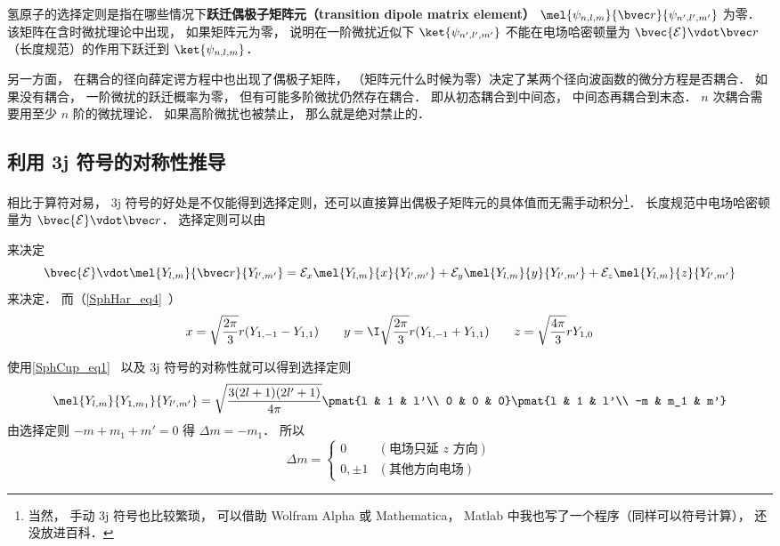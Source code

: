 
\begin{issues}
\issueDraft
\end{issues}


氢原子的选择定则是指在哪些情况下\textbf{跃迁偶极子矩阵元（transition dipole matrix element）} $\mel{\psi_{n,l,m}}{\bvec r}{\psi_{n',l',m'}}$ 为零． 该矩阵在含时微扰理论中出现， 如果矩阵元为零， 说明在一阶微扰近似下 $\ket{\psi_{n',l',m'}}$ 不能在电场哈密顿量为 $\bvec{\mathcal{E}}\vdot \bvec r$（长度规范）的作用下跃迁到 $\ket{\psi_{n,l,m}}$．

另一方面， 在耦合的径向薛定谔方程中也出现了偶极子矩阵， 
（矩阵元什么时候为零）决定了某两个径向波函数的微分方程是否耦合． 如果没有耦合， 一阶微扰的跃迁概率为零， 但有可能多阶微扰仍然存在耦合． 即从初态耦合到中间态， 中间态再耦合到末态． $n$ 次耦合需要用至少 $n$ 阶的微扰理论． 如果高阶微扰也被禁止， 那么就是绝对禁止的． %

\subsection{利用 3j 符号的对称性推导}
相比于算符对易， 3j 符号的好处是不仅能得到选择定则，还可以直接算出偶极子矩阵元的具体值而无需手动积分\footnote{当然， 手动 3j 符号也比较繁琐， 可以借助 Wolfram Alpha 或 Mathematica， Matlab 中我也写了一个程序（同样可以符号计算）， 还没放进百科．}． 长度规范中电场哈密顿量为 $\bvec{\mathcal{E}}\vdot \bvec r$． 选择定则可以由

 来决定
\begin{equation}
\bvec{\mathcal{E}}\vdot \mel{Y_{l,m}}{\bvec r}{Y_{l',m'}} = \mathcal{E}_x \mel{Y_{l,m}}{x}{Y_{l',m'}} + \mathcal{E}_y \mel{Y_{l,m}}{y}{Y_{l',m'}} + \mathcal{E}_z \mel{Y_{l,m}}{z}{Y_{l',m'}}
\end{equation}
来决定． 而（\autoref{SphHar_eq4}~）
\begin{equation}
x = \sqrt{\frac{2\pi}{3}} r (Y_{1,-1} - Y_{1,1}) \qquad
y = \I \sqrt{\frac{2\pi}{3}} r (Y_{1,-1}+Y_{1,1}) \qquad
z = \sqrt{\frac{4\pi}{3}} rY_{1,0}
\end{equation}

使用\autoref{SphCup_eq1}~ 以及 3j 符号的对称性就可以得到选择定则
\begin{equation}\label{SelRul_eq1}
\mel{Y_{l,m}}{Y_{1,m_1}}{Y_{l',m'}} = \sqrt{\frac{3(2l+1)(2l'+1)}{4\pi}} \pmat{l & 1 & l'\\ 0 & 0 & 0}\pmat{l & 1 & l'\\ -m & m_1 & m'}
\end{equation}
由选择定则 $-m + m_1 + m' = 0$ 得 $\Delta m = -m_1$． 所以
\begin{equation}
\Delta m =
\begin{cases}
0 & (\text{电场只延 $z$ 方向}) \\
0, \pm 1 & (\text{其他方向电场})
\end{cases}
\end{equation}

